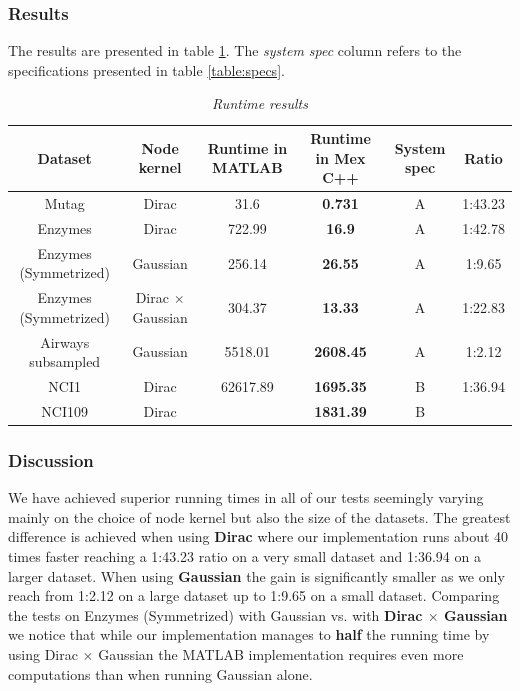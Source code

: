 \documentclass{article}
\begin{document}
\subsubsection{Results}
The results are presented in table \ref{table:runtime_results}. The \textit{system spec} column refers to the specifications presented in table \ref{table:specs}.
\begin{table}[H]
	\centering
	\hspace*{-0.7in}
	\scalebox{0.7} {
		\begin{tabular}{c|c|c|c|c|c}
			Dataset & Node kernel & Runtime in MATLAB & Runtime in Mex C++ & System spec & Ratio\\
			\hline
			Mutag & Dirac & 31.6 & \textbf{0.731} & A & 1:43.23\\
			Enzymes & Dirac & 722.99 & \textbf{16.9} & A & 1:42.78\\
			Enzymes (Symmetrized) & Gaussian & 256.14 & \textbf{26.55} & A & 1:9.65 \\ 
			Enzymes (Symmetrized) & Dirac $\times$ Gaussian & 304.37  & \textbf{13.33} & A & 1:22.83\\
			Airways subsampled & Gaussian & 5518.01 & \textbf{2608.45} & A & 1:2.12 \\
			NCI1 & Dirac & 62617.89 & \textbf{1695.35} & B & 1:36.94\\
			NCI109 & Dirac & & \textbf{1831.39} & B & 
		\end{tabular}
	}
	\caption{\textit{Runtime results}}
	\label{table:runtime_results}
\end{table}

\subsubsection{Discussion}
We have achieved superior running times in all of our tests seemingly varying mainly on the choice of node kernel but also the size of the datasets. The greatest difference is achieved when using \textbf{Dirac} where our implementation runs about 40 times faster reaching a 1:43.23 ratio on a very small dataset and 1:36.94 on a larger dataset. When using \textbf{Gaussian} the gain is significantly smaller as we only reach from 1:2.12 on a large dataset up to 1:9.65 on a small dataset. Comparing the tests on Enzymes (Symmetrized) with Gaussian vs. with \textbf{Dirac $\times$ Gaussian} we notice that while our implementation manages to \textbf{half} the running time by using Dirac $\times$ Gaussian the MATLAB implementation requires even more computations than when running Gaussian alone.
\end{document}
